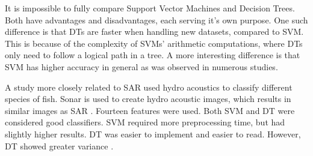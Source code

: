\hspace{0.5cm} It is impossible to fully compare Support Vector Machines and Decision Trees. Both have advantages and disadvantages, each serving it's own purpose. One such difference is that DTs are faster when handling new datasets, compared to SVM. This is because of the complexity of SVMs' arithmetic computations, where DTs only need to follow a logical path in a tree. A more interesting difference is that SVM has higher accuracy in general as was observed in numerous studies\cite{arun2010hybrid}.
 
A study more closely related to SAR used hydro acoustics to classify different species of fish. Sonar is used to create hydro acoustic images, which results in similar images as SAR \cite{griffiths2003synthetic}. Fourteen features were used. Both SVM and DT were considered good classifiers. SVM required more preprocessing time, but had slightly higher results. DT was easier to implement and easier to read. However, DT showed greater variance \cite{Robotham2011170}.



